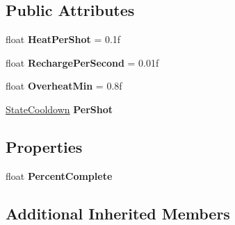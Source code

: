 \subsection*{Public Attributes}
\begin{DoxyCompactItemize}
\item 
\hypertarget{class_skyrates_1_1_misc_1_1_state_overheat_a4a248326836dd10446677701227b626c}{float {\bfseries Heat\-Per\-Shot} = 0.\-1f}\label{class_skyrates_1_1_misc_1_1_state_overheat_a4a248326836dd10446677701227b626c}

\item 
\hypertarget{class_skyrates_1_1_misc_1_1_state_overheat_ac658292da649af04824f4c206880f805}{float {\bfseries Recharge\-Per\-Second} = 0.\-01f}\label{class_skyrates_1_1_misc_1_1_state_overheat_ac658292da649af04824f4c206880f805}

\item 
\hypertarget{class_skyrates_1_1_misc_1_1_state_overheat_a70ee30bc4bd2595f466ad7ec89d93cfc}{float {\bfseries Overheat\-Min} = 0.\-8f}\label{class_skyrates_1_1_misc_1_1_state_overheat_a70ee30bc4bd2595f466ad7ec89d93cfc}

\item 
\hypertarget{class_skyrates_1_1_misc_1_1_state_overheat_ab1309ed38d6a412b24b4d6c07d64f2d9}{\hyperlink{class_skyrates_1_1_misc_1_1_state_cooldown}{State\-Cooldown} {\bfseries Per\-Shot}}\label{class_skyrates_1_1_misc_1_1_state_overheat_ab1309ed38d6a412b24b4d6c07d64f2d9}

\end{DoxyCompactItemize}
\subsection*{Properties}
\begin{DoxyCompactItemize}
\item 
\hypertarget{class_skyrates_1_1_misc_1_1_state_overheat_aba7f1ae4ebf1512a5c979731349e8d54}{float {\bfseries Percent\-Complete}}\label{class_skyrates_1_1_misc_1_1_state_overheat_aba7f1ae4ebf1512a5c979731349e8d54}

\end{DoxyCompactItemize}
\subsection*{Additional Inherited Members}


